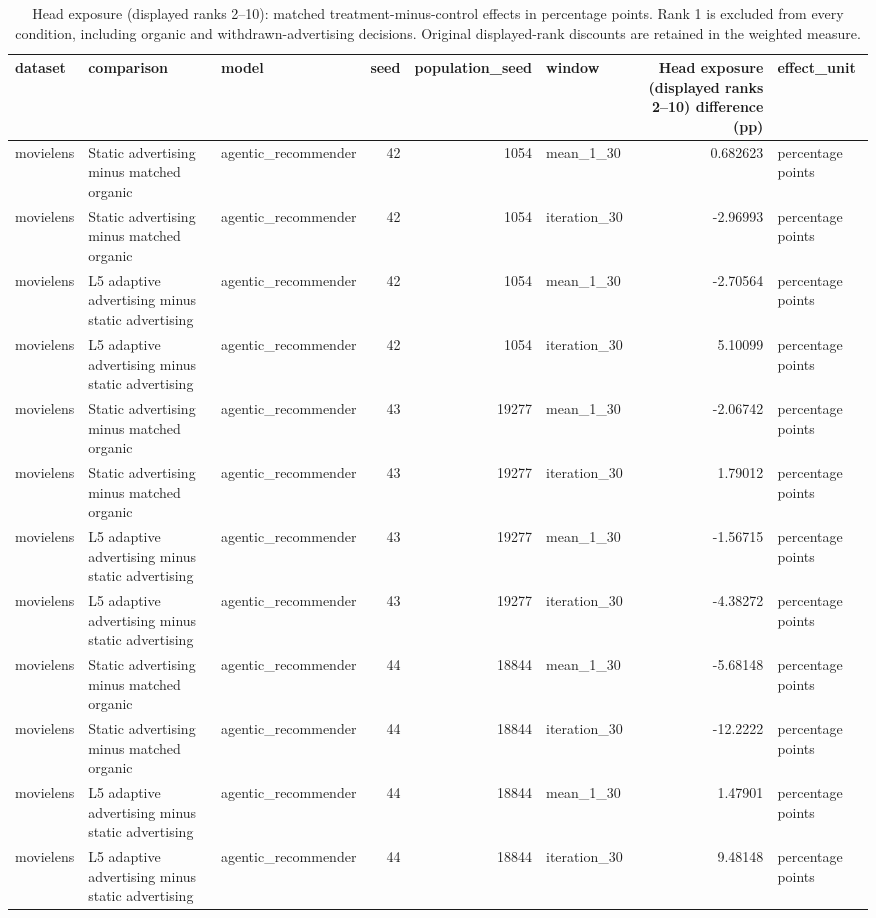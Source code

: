 \begin{table}[htbp!]
\centering
\small
\setlength{\tabcolsep}{3pt}
\renewcommand{\arraystretch}{1.1}
\begin{tabular}{lllrrlrl}
\hline
dataset & comparison & model & seed & population\_seed & window & Head exposure (displayed ranks 2–10) difference (pp) & effect\_unit \\
\hline
movielens & Static advertising minus matched organic & agentic\_recommender & 42 & 1054 & mean\_1\_30 & 0.682623 & percentage points \\
movielens & Static advertising minus matched organic & agentic\_recommender & 42 & 1054 & iteration\_30 & -2.96993 & percentage points \\
movielens & L5 adaptive advertising minus static advertising & agentic\_recommender & 42 & 1054 & mean\_1\_30 & -2.70564 & percentage points \\
movielens & L5 adaptive advertising minus static advertising & agentic\_recommender & 42 & 1054 & iteration\_30 & 5.10099 & percentage points \\
movielens & Static advertising minus matched organic & agentic\_recommender & 43 & 19277 & mean\_1\_30 & -2.06742 & percentage points \\
movielens & Static advertising minus matched organic & agentic\_recommender & 43 & 19277 & iteration\_30 & 1.79012 & percentage points \\
movielens & L5 adaptive advertising minus static advertising & agentic\_recommender & 43 & 19277 & mean\_1\_30 & -1.56715 & percentage points \\
movielens & L5 adaptive advertising minus static advertising & agentic\_recommender & 43 & 19277 & iteration\_30 & -4.38272 & percentage points \\
movielens & Static advertising minus matched organic & agentic\_recommender & 44 & 18844 & mean\_1\_30 & -5.68148 & percentage points \\
movielens & Static advertising minus matched organic & agentic\_recommender & 44 & 18844 & iteration\_30 & -12.2222 & percentage points \\
movielens & L5 adaptive advertising minus static advertising & agentic\_recommender & 44 & 18844 & mean\_1\_30 & 1.47901 & percentage points \\
movielens & L5 adaptive advertising minus static advertising & agentic\_recommender & 44 & 18844 & iteration\_30 & 9.48148 & percentage points \\
\hline
\end{tabular}
\caption{Head exposure (displayed ranks 2–10): matched treatment-minus-control effects in percentage points. Rank 1 is excluded from every condition, including organic and withdrawn-advertising decisions. Original displayed-rank discounts are retained in the weighted measure.}
\label{chap:results:tab:rq1_advertising_head_exposure_ranks_2_10_effects}
\end{table}
